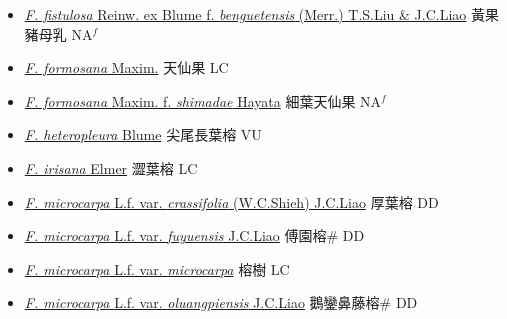 \begin{itemize}
\begin{itemize}
        \item[] \href{http://www.theplantlist.org/tpl1.1/search?q=Ficus+fistulosa+ f. +benguetensis}{\textit{F. fistulosa} Reinw. ex Blume  f.  \textit{benguetensis} (Merr.) T.S.Liu \& J.C.Liao}   黃果豬母乳 NA$^f$
        \item[] \href{http://www.theplantlist.org/tpl1.1/search?q=Ficus+formosana}{\textit{F. formosana} Maxim.}   天仙果 LC
        \item[] \href{http://www.theplantlist.org/tpl1.1/search?q=Ficus+formosana+ f. +shimadae}{\textit{F. formosana} Maxim.  f.  \textit{shimadae} Hayata}   細葉天仙果 NA$^f$
        \item[] \href{http://www.theplantlist.org/tpl1.1/search?q=Ficus+heteropleura}{\textit{F. heteropleura} Blume}   尖尾長葉榕 VU
        \item[] \href{http://www.theplantlist.org/tpl1.1/search?q=Ficus+irisana}{\textit{F. irisana} Elmer}   澀葉榕 LC
        \item[] \href{http://www.theplantlist.org/tpl1.1/search?q=Ficus+microcarpa+var.+crassifolia}{\textit{F. microcarpa} L.f. var. \textit{crassifolia} (W.C.Shieh) J.C.Liao}   厚葉榕 DD
        \item[] \href{http://www.theplantlist.org/tpl1.1/search?q=Ficus+microcarpa+var.+fuyuensis}{\textit{F. microcarpa} L.f. var. \textit{fuyuensis} J.C.Liao}   傅園榕\# DD
        \item[] \href{http://www.theplantlist.org/tpl1.1/search?q=Ficus+microcarpa+var.+microcarpa}{\textit{F. microcarpa} L.f. var. \textit{microcarpa}}   榕樹 LC
        \item[] \href{http://www.theplantlist.org/tpl1.1/search?q=Ficus+microcarpa+var.+oluangpiensis}{\textit{F. microcarpa} L.f. var. \textit{oluangpiensis} J.C.Liao}   鵝鑾鼻藤榕\# DD

\end{itemize}
\end{itemize}

